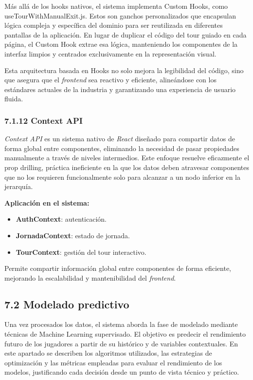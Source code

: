 Más allá de los hooks nativos, el sistema implementa Custom Hooks, como useTourWithManualExit.js.
Estos son ganchos personalizados que encapsulan lógica compleja y específica del dominio para ser
reutilizada en diferentes pantallas de la aplicación. En lugar de duplicar el código del tour guiado
en cada página, el Custom Hook extrae esa lógica, manteniendo los componentes de la interfaz limpios
y centrados exclusivamente en la representación visual.
 
Esta arquitectura basada en Hooks no solo mejora la legibilidad del código, sino que asegura que el
\textit{frontend} sea reactivo y eficiente, alineándose con los estándares actuales de la industria y
garantizando una experiencia de usuario fluida.
 
\subsubsection{7.1.12 Context API}
 
\textit{Context API} es un sistema nativo de \textit{React} diseñado para compartir datos de forma global entre componentes,
eliminando la necesidad de pasar propiedades manualmente a través de niveles intermedios.
Este enfoque resuelve eficazmente el prop drilling, práctica ineficiente en la que los datos deben atravesar
componentes que no los requieren funcionalmente solo para alcanzar a un nodo inferior en la jerarquía.
 
\textbf{Aplicación en el sistema:}
\begin{itemize}
\item \textbf{AuthContext}: autenticación.
\item \textbf{JornadaContext}: estado de jornada.
\item \textbf{TourContext}: gestión del tour interactivo.
\end{itemize}
 
Permite compartir información global entre componentes de forma eficiente,
mejorando la escalabilidad y mantenibilidad del \textit{frontend}.
 
\subsection{7.2 Modelado predictivo}
Una vez procesados los datos, el sistema aborda la fase de modelado mediante
técnicas de Machine Learning supervisado. El objetivo es predecir el rendimiento
futuro de los jugadores a partir de su histórico y de variables contextuales.
En este apartado se describen los algoritmos utilizados, las estrategias de
optimización y las métricas empleadas para evaluar el rendimiento de los
modelos, justificando cada decisión desde un punto de vista técnico y práctico.
 
